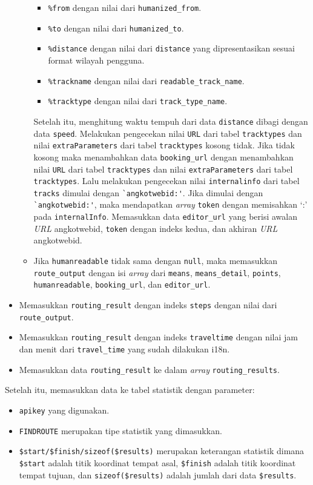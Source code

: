 \begin{itemize}
\begin{itemize}
		  \begin{itemize}
		  		\item \verb!%from! dengan nilai dari \verb!humanized_from!.
		  		\item \verb!%to! dengan nilai dari \verb!humanized_to!.
		  		\item \verb!%distance! dengan nilai dari \verb!distance! yang dipresentasikan sesuai format wilayah pengguna.
		  		\item \verb!%trackname! dengan nilai dari \verb!readable_track_name!.
		  		\item \verb!%tracktype! dengan nilai dari \verb!track_type_name!.		  		
		  \end{itemize}
		 Setelah itu, menghitung waktu tempuh dari data \verb!distance! dibagi dengan data \verb!speed!. Melakukan pengecekan nilai \verb!URL! dari tabel \verb!tracktypes! dan nilai  \verb!extraParameters! dari tabel \verb!tracktypes! kosong tidak. Jika tidak kosong maka menambahkan data \verb!booking_url! dengan menambahkan nilai \verb!URL! dari tabel \verb!tracktypes! dan nilai  \verb!extraParameters! dari tabel \verb!tracktypes!. 
		 Lalu melakukan pengecekan nilai \verb!internalinfo! dari tabel \verb!tracks! dimulai dengan \verb!`angkotwebid:'!. Jika dimulai dengan \verb!`angkotwebid:'!, maka mendapatkan \textit{array} \verb!token! dengan memisahkan `:' pada \verb!internalInfo!. Memasukkan data  \verb!editor_url! yang berisi awalan \textit{URL} angkotwebid, \verb!token! dengan indeks kedua, dan akhiran \textit{URL} angkotwebid. 
		 \item Jika \verb!humanreadable! tidak sama dengan \verb!null!, maka memasukkan \verb!route_output! dengan isi \textit{array} dari \verb!means!, \verb!means_detail!, \verb!points!,  \verb!humanreadable!, \verb!booking_url!, dan \verb!editor_url!. 
	\end{itemize}
	\item Memasukkan \verb!routing_result! dengan indeks \verb!steps! dengan nilai dari  \verb!route_output!.
	\item Memasukkan \verb!routing_result! dengan indeks \verb!traveltime! dengan nilai jam dan menit dari \verb!travel_time! yang sudah dilakukan i18n.
	\item Memasukkan data \verb!routing_result! ke dalam \textit{array} \verb!routing_results!.
\end{itemize}
Setelah itu, memasukkan data ke tabel statistik dengan parameter:
	\begin{itemize}
		\item \verb!apikey! yang digunakan.
		\item \verb!FINDROUTE! merupakan tipe statistik yang dimasukkan.
		\item \verb!$start/$finish/sizeof($results)! merupakan keterangan statistik dimana \verb!$start! adalah titik koordinat tempat asal, \verb!$finish! adalah titik koordinat tempat tujuan, dan \verb!sizeof($results)! adalah jumlah dari data \verb!$results!.
	\end{itemize}
